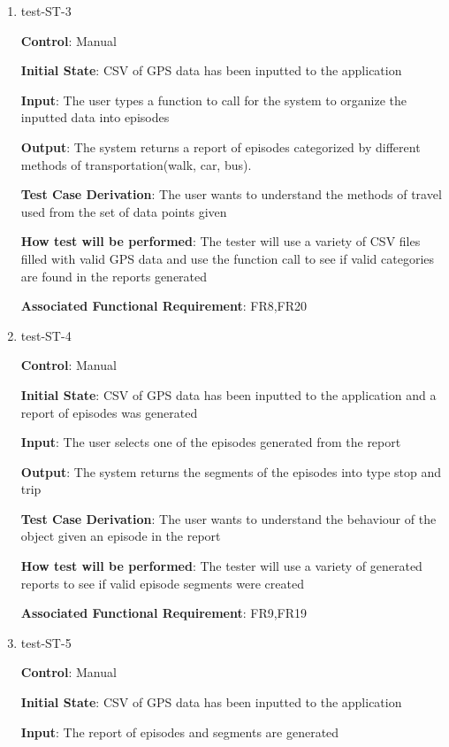 \documentclass[12pt, titlepage]{article}
\begin{document}
\begin{enumerate}
\item{test-ST-3\\}

\textbf{Control}: Manual
					
\textbf{Initial State}: CSV of GPS data has been inputted to the application
					
\textbf{Input}: The user types a function to call for the system to organize the inputted data into episodes 
					
\textbf{Output}: The system returns a report of episodes categorized by different  methods of transportation(walk, car, bus).

\textbf{Test Case Derivation}: The user wants to understand the methods of travel used from the set of data points given

\textbf{How test will be performed}: The tester will use a variety of CSV files filled with valid GPS data and use the function call to see if valid categories are found in the reports generated


\textbf{Associated Functional Requirement}: FR8,FR20


\item{test-ST-4\\}

\textbf{Control}: Manual
					
\textbf{Initial State}: CSV of GPS data has been inputted to the application and a report of episodes was generated 
					
\textbf{Input}: The user selects one of the episodes generated from the report
					
\textbf{Output}: The system returns the segments of the episodes into type stop and trip 

\textbf{Test Case Derivation}: The user wants to understand the behaviour of the object given an episode in the report

\textbf{How test will be performed}: The tester will use a variety of generated reports to see if valid episode segments were created 


\textbf{Associated Functional Requirement}: FR9,FR19


\item{test-ST-5\\}

\textbf{Control}: Manual
					
\textbf{Initial State}: CSV of GPS data has been inputted to the application 
					
\textbf{Input}: The report of episodes and segments are generated
					

\end{enumerate}
\end{document}
